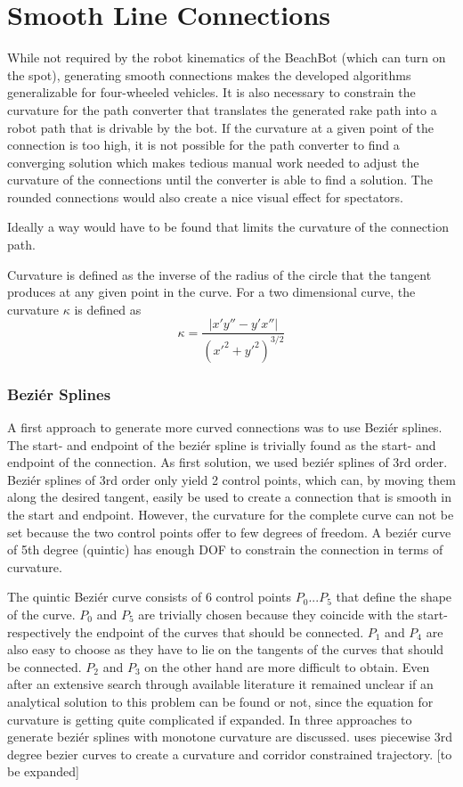 \clearpage
\section{Smooth Line Connections}

While not required by the robot kinematics of the BeachBot (which can turn on the spot), generating smooth connections 
makes the developed algorithms generalizable for four-wheeled vehicles.
It is also necessary to constrain the curvature for the path converter that translates the generated rake path into a robot path that is drivable by the bot. If the curvature at a given point of the connection is too high, it is not possible for the path converter to find a converging solution which makes tedious manual work needed to adjust the curvature of the connections until the converter is able to find a solution. The rounded connections would also create a nice visual effect for spectators.

Ideally a way would have to be found that limits the curvature of the connection path.

Curvature is defined as the inverse of the radius of the circle that the tangent produces at any given point in the curve. For a two dimensional curve, the curvature $\kappa$ is defined as 
$$\kappa = \frac{|x'y''-y'x''|}{(x'^2+y'^2)^{3/2}}$$


\subsubsection{Beziér Splines}

A first approach to generate more curved connections was to use Beziér splines.
The start- and endpoint of the beziér spline is trivially found as the start- and endpoint of the connection. As first solution, we used beziér splines of 3rd order. Beziér splines of 3rd order only yield 2 control points, which can, by moving them along the desired tangent, easily be used to create a connection that is smooth in the start and endpoint. However, the curvature for the complete curve can not be set because the two control points offer to few degrees of freedom. A beziér curve of 5th degree (quintic) has enough DOF to constrain the connection in terms of curvature.

The quintic Beziér curve consists of 6 control points $P_0 ... P_5$ that define the shape of the curve. $P_0$ and $P_5$ are trivially chosen because they coincide with the start- respectively the endpoint of the curves that should be connected. $P_1$ and $P_4$ are also easy to choose as they have to lie on the tangents of the curves that should be connected. $P_2$ and $P_3$ on the other hand are more difficult to obtain. Even after an extensive search through available literature it remained unclear if an analytical solution to this problem can be found or not, since the equation for curvature is getting quite complicated if expanded. In \cite{doi:10.1137/1.9781611971521.ch5} three approaches to generate beziér splines with monotone curvature are discussed. \cite{choi2010piecewise} uses piecewise 3rd degree bezier curves to create a curvature and corridor constrained trajectory.  [to be expanded]

